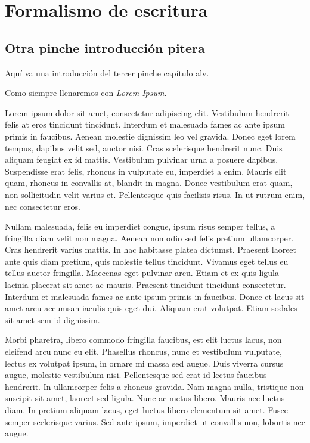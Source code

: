 
\chapter{Formalismo de escritura}
\label{capIII}



\section{Otra pinche introducción pitera}

Aquí va una introducción del tercer pinche capítulo alv.

Como siempre llenaremos con \textit{Lorem Ipsum}.

Lorem ipsum dolor sit amet, consectetur adipiscing elit. Vestibulum hendrerit felis at eros tincidunt tincidunt. Interdum et malesuada fames ac ante ipsum primis in faucibus. Aenean molestie dignissim leo vel gravida. Donec eget lorem tempus, dapibus velit sed, auctor nisi. Cras scelerisque hendrerit nunc. Duis aliquam feugiat ex id mattis. Vestibulum pulvinar urna a posuere dapibus. Suspendisse erat felis, rhoncus in vulputate eu, imperdiet a enim. Mauris elit quam, rhoncus in convallis at, blandit in magna. Donec vestibulum erat quam, non sollicitudin velit varius et. Pellentesque quis facilisis risus. In ut rutrum enim, nec consectetur eros.

Nullam malesuada, felis eu imperdiet congue, ipsum risus semper tellus, a fringilla diam velit non magna. Aenean non odio sed felis pretium ullamcorper. Cras hendrerit varius mattis. In hac habitasse platea dictumst. Praesent laoreet ante quis diam pretium, quis molestie tellus tincidunt. Vivamus eget tellus eu tellus auctor fringilla. Maecenas eget pulvinar arcu. Etiam et ex quis ligula lacinia placerat sit amet ac mauris. Praesent tincidunt tincidunt consectetur. Interdum et malesuada fames ac ante ipsum primis in faucibus. Donec et lacus sit amet arcu accumsan iaculis quis eget dui. Aliquam erat volutpat. Etiam sodales sit amet sem id dignissim.

Morbi pharetra, libero commodo fringilla faucibus, est elit luctus lacus, non eleifend arcu nunc eu elit. Phasellus rhoncus, nunc et vestibulum vulputate, lectus ex volutpat ipsum, in ornare mi massa sed augue. Duis viverra cursus augue, molestie vestibulum nisi. Pellentesque sed erat id lectus faucibus hendrerit. In ullamcorper felis a rhoncus gravida. Nam magna nulla, tristique non suscipit sit amet, laoreet sed ligula. Nunc ac metus libero. Mauris nec luctus diam. In pretium aliquam lacus, eget luctus libero elementum sit amet. Fusce semper scelerisque varius. Sed ante ipsum, imperdiet ut convallis non, lobortis nec augue.

